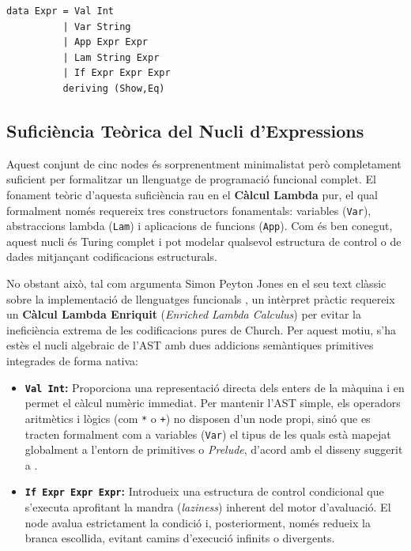 \begin{lstlisting}[style=haskellstyle, caption=Definició del tipus algebraic d'expressions (Expr)]
data Expr = Val Int                 
          | Var String              
          | App Expr Expr           
          | Lam String Expr       
          | If Expr Expr Expr
          deriving (Show,Eq)
\end{lstlisting}

\subsection{Suficiència Teòrica del Nucli d'Expressions}
Aquest conjunt de cinc nodes és sorprenentment minimalistat però completament suficient per formalitzar un llenguatge de programació funcional complet. El fonament teòric d'aquesta suficiència rau en el \textbf{Càlcul Lambda} pur, el qual formalment només requereix tres constructors fonamentals: variables (\texttt{Var}), abstraccions lambda (\texttt{Lam}) i aplicacions de funcions (\texttt{App}). Com és ben conegut, aquest nucli és Turing complet i pot modelar qualsevol estructura de control o de dades mitjançant codificacions estructurals. 

No obstant això, tal com argumenta Simon Peyton Jones en el seu text clàssic sobre la implementació de llenguatges funcionals \cite{peyton1987implementation}, un intèrpret pràctic requereix un \textbf{Càlcul Lambda Enriquit} (\textit{Enriched Lambda Calculus}) per evitar la ineficiència extrema de les codificacions pures de Church. Per aquest motiu, s'ha estès el nucli algebraic de l'AST amb dues addicions semàntiques primitives integrades de forma nativa:
\begin{itemize}
    \item \textbf{\texttt{Val Int}:} Proporciona una representació directa dels enters de la màquina i en permet el càlcul numèric immediat. Per mantenir l'AST simple, els operadors aritmètics i lògics (com \texttt{*} o \texttt{+}) no disposen d'un node propi, sinó que es tracten formalment com a variables (\texttt{Var}) el tipus de les quals està mapejat globalment a l'entorn de primitives o \textit{Prelude}, d'acord amb el disseny suggerit a \cite{peyton1987implementation}.
    \item \textbf{\texttt{If Expr Expr Expr}:} Introdueix una estructura de control condicional que s'executa aprofitant la mandra (\textit{laziness}) inherent del motor d'avaluació. El node avalua estrictament la condició i, posteriorment, només redueix la branca escollida, evitant camins d'execució infinits o divergents.
\end{itemize}

